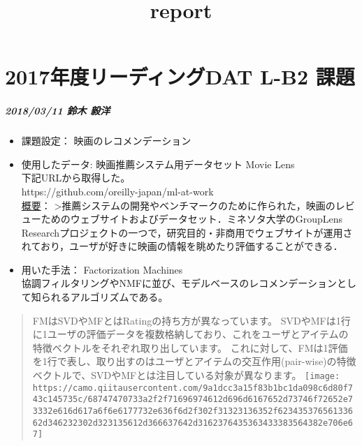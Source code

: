 \documentclass[11pt]{article}
\title{report}
\makeatletter
\def\maxwidth{\ifdim\Gin@nat@width>\linewidth\linewidth
    \else\Gin@nat@width\fi}
\let\Oldincludegraphics\includegraphics
\renewcommand{\includegraphics}[1]{\Oldincludegraphics[width=.8\maxwidth]{#1}}
\makeatother
\begin{document}
    
    
    \maketitle
    
    

    
    \section{2017年度リーディングDAT L-B2
課題}\label{ux5e74ux5ea6ux30eaux30fcux30c7ux30a3ux30f3ux30b0dat-l-b2-ux8ab2ux984c}

    \subparagraph{2018/03/11 鈴木 毅洋}\label{ux9234ux6728-ux6bc5ux6d0b}

    \begin{itemize}
\item
  課題設定： 映画のレコメンデーション
\item
  使用したデータ: 映画推薦システム用データセット Movie Lens\\
  下記URLから取得した。\\
  https://github.com/oreilly-japan/ml-at-work\\
  \href{http://yag.xyz/blog/2015/10/03/movielens-datasets/}{概要}：
  \textgreater{}推薦システムの開発やベンチマークのために作られた，映画のレビューためのウェブサイトおよびデータセット．ミネソタ大学のGroupLens
  Researchプロジェクトの一つで，研究目的・非商用でウェブサイトが運用されており，ユーザが好きに映画の情報を眺めたり評価することができる．
\item
  用いた手法： Factorization Machines\\
  協調フィルタリングやNMFに並び、モデルベースのレコメンデーションとして知られるアルゴリズムである。
\end{itemize}

\begin{quote}
FMはSVDやMFとはRatingの持ち方が異なっています。
SVDやMFは1行に1ユーザの評価データを複数格納しており、これをユーザとアイテムの特徴ベクトルをそれぞれ取り出しています。
これに対して、FMは1評価を1行で表し、取り出すのはユーザとアイテムの交互作用(pair-wise)の特徴ベクトルで、SVDやMFとは注目している対象が異なります。
\texttt{[image: https://camo.qiitausercontent.com/9a1dcc3a15f83b1bc1da098c6d80f743c145735c/68747470733a2f2f71696974612d696d6167652d73746f72652e73332e616d617a6f6e6177732e636f6d2f302f31323136352f62343537656133662d346232302d323135612d366637642d3162376435363433383564382e706e67]}
\end{quote}
\end{document}
